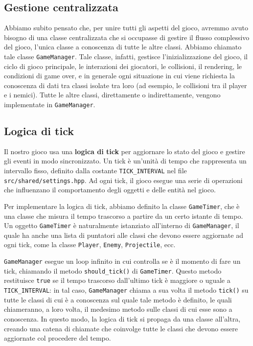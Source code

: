 \documentclass[a4paper,12pt]{article}
\begin{document}
\subsection{Gestione centralizzata}
Abbiamo subito pensato che, per unire tutti gli aspetti del gioco, avremmo avuto bisogno di una classe centralizzata che si occupasse di gestire il flusso complessivo del gioco, l'unica classe a conoscenza di tutte le altre classi. Abbiamo chiamato tale classe \texttt{GameManager}. Tale classe, infatti, gestisce l'inizializzazione del gioco, il ciclo di gioco principale, le interazioni dei giocatori, le collisioni, il rendering, le condizioni di game over, e in generale ogni situazione in cui viene richiesta la conoscenza di dati tra classi isolate tra loro (ad esempio, le collisioni tra il player e i nemici). Tutte le altre classi, direttamente o indirettamente, vengono implementate in \texttt{GameManager}.

\subsection{Logica di tick}
Il nostro gioco usa una \textbf{logica di tick} per aggiornare lo stato del gioco e gestire gli eventi in modo sincronizzato. Un tick è un'unità di tempo che rappresenta un intervallo fisso, definito dalla costante \texttt{TICK\_INTERVAL} nel file \texttt{src/shared/settings.hpp}. Ad ogni tick, il gioco esegue una serie di operazioni che influenzano il comportamento degli oggetti e delle entità nel gioco.

Per implementare la logica di tick, abbiamo definito la classe \texttt{GameTimer}, che è una classe che misura il tempo trascorso a partire da un certo istante di tempo. Un oggetto \texttt{GameTimer} è naturalmente istanziato all'interno di \texttt{GameManager}, il quale ha anche una lista di puntatori alle classi che devono essere aggiornate ad ogni tick, come la classe \texttt{Player}, \texttt{Enemy}, \texttt{Projectile}, ecc.

\texttt{GameManager} esegue un loop infinito in cui controlla se è il momento di fare un tick, chiamando il metodo \texttt{should\_tick()} di \texttt{GameTimer}. Questo metodo restituisce \texttt{true} se il tempo trascorso dall'ultimo tick è maggiore o uguale a \texttt{TICK\_INTERVAL}: in tal caso, \texttt{GameManager} chiama a sua volta il metodo \texttt{tick()} su tutte le classi di cui è a conoscenza sul quale tale metodo è definito, le quali chiameranno, a loro volta, il medesimo metodo sulle classi di cui esse sono a conoscenza. In questo modo, la logica di tick si propaga da una classe all'altra, creando una catena di chiamate che coinvolge tutte le classi che devono essere aggiornate col procedere del tempo.
\end{document}
